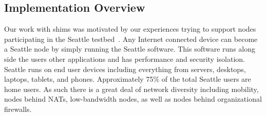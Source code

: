 %
%
%
%
%
%
%
%
%
%
%
%

\subsection{Implementation Overview}
\label{implementation-overview}

Our work with shims was motivated by our experiences trying to support nodes 
participating in the Seattle testbed~\cite{Seattle_SIGCSE09,Seattlewebpage}.
Any Internet connected device can become a Seattle node by simply running 
the Seattle software.  This software runs along side the users other 
applications and has performance and security isolation.
Seattle runs on end user devices including everything from servers, desktops, 
laptops, tablets, and phones.   Approximately 75\% of the total Seattle users 
are home users.   As such there is a great deal of network diversity including
mobility, nodes behind NATs, low-bandwidth nodes, as well as nodes behind 
organizational firewalls.

